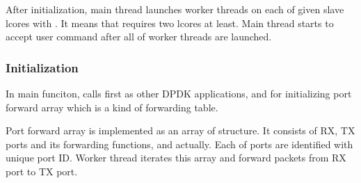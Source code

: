 \documentclass[a4paper,11pt,openany,oneside,english]{sphinxmanual}
\begin{document}
After initialization, main thread launches worker threads on each of given
slave lcores with . It means that 
requires two lcores at least.
Main thread starts to accept user command after all of worker threads are
launched.


\subsubsection{Initialization}
\label{\detokenize{design/impl/spp_nfv:initialization}}
In main funciton,  calls  first as other
DPDK applications,  and 
for initializing port forward array which is a kind of forwarding table.

\begin{sphinxVerbatim}[commandchars=\\\{\},formatcom=\footnotesize]
   \PYG{p}{[}\PYG{p}{]}

           
           
                 

\end{sphinxVerbatim}

Port forward array is implemented as an array of  structure.
It consists of RX, TX ports and its forwarding functions,
 and  actually.
Each of ports are identified with unique port ID.
Worker thread iterates this array and forward packets from RX port to
TX port.
\end{document}
